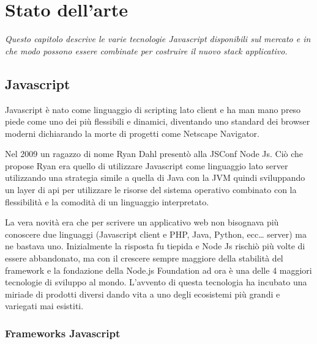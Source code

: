 \chapter{Stato dell'arte}
\label{cha:intro}
\vspace{5mm}
\emph{Questo capitolo descrive le varie tecnologie Javascript disponibili sul mercato e in che modo possono essere combinate per costruire il nuovo stack applicativo.}
\section{Javascript}\vspace{5mm}
Javascript è nato come linguaggio di scripting lato client e ha man mano preso piede come uno dei più flessibili e dinamici, diventando uno standard dei browser moderni dichiarando la morte di progetti come Netscape Navigator.\vspace{5mm}

Nel 2009 un ragazzo di nome Ryan Dahl presentò alla JSConf Node Js. Ciò che propose Ryan era quello di utilizzare Javascript come linguaggio lato server utilizzando una strategia simile a quella di Java con la JVM quindi sviluppando un layer di api per utilizzare le risorse del sistema operativo combinato con la flessibilità e la comodità di un linguaggio interpretato.\vspace{5mm}

La vera novità era che per scrivere un applicativo web non bisognava più conoscere due linguaggi (Javascript client e PHP, Java, Python, ecc… server) ma ne bastava uno. Inizialmente la risposta fu tiepida e Node Js rischiò più volte di essere abbandonato, ma con il crescere sempre maggiore della stabilità del framework e la fondazione della Node.js Foundation ad ora è una delle 4 maggiori tecnologie di sviluppo al mondo. L’avvento di questa tecnologia ha incubato una miriade di prodotti diversi dando vita a uno degli ecosistemi più grandi e variegati mai esistiti.\vspace{5mm}

\subsection{Frameworks Javascript}\vspace{5mm}

